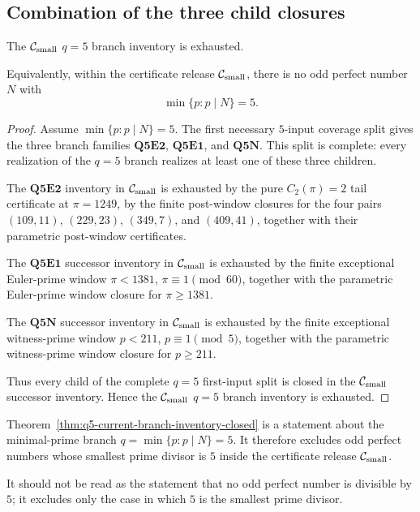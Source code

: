 \subsection{Combination of the three child closures}
\label{subsec:q5-current-branch-inventory-closure}

\begin{theorem}[Closure of the release \texorpdfstring{\(q=5\)}{q=5} branch inventory]
\label{thm:q5-current-branch-inventory-closed}
The \(\mathcal C_{\mathrm{small}}\) \(q=5\) branch inventory is exhausted.

Equivalently, within the certificate release \(\mathcal C_{\mathrm{small}}\), there is no odd
perfect number \(N\) with
\[
  \min\{p:p\mid N\}=5.
\]
\end{theorem}

\begin{proof}
Assume \(\min\{p:p\mid N\}=5\).  The first necessary \(5\)-input coverage split
gives the three branch families \(\mathbf{Q5E2}\), \(\mathbf{Q5E1}\), and
\(\mathbf{Q5N}\).  This split is complete: every realization of the \(q=5\)
branch realizes at least one of these three children.

The \(\mathbf{Q5E2}\) inventory in \(\mathcal C_{\mathrm{small}}\) is exhausted by the pure
\(C_2(\pi)=2\) tail certificate at \(\pi=1249\), by the finite post-window
closures for the four pairs \((109,11)\), \((229,23)\), \((349,7)\), and
\((409,41)\), together with their parametric post-window
certificates.

The \(\mathbf{Q5E1}\) successor inventory in \(\mathcal C_{\mathrm{small}}\) is exhausted by the
finite exceptional Euler-prime window \(\pi<1381\), \(\pi\equiv1\pmod{60}\),
together with the parametric Euler-prime window closure for \(\pi\ge1381\).

The \(\mathbf{Q5N}\) successor inventory in \(\mathcal C_{\mathrm{small}}\) is exhausted by the
finite exceptional witness-prime window \(p<211\), \(p\equiv1\pmod5\), together
with the parametric witness-prime window closure for \(p\ge211\).

Thus every child of the complete \(q=5\) first-input split is closed in the
\(\mathcal C_{\mathrm{small}}\) successor inventory.  Hence the \(\mathcal C_{\mathrm{small}}\) \(q=5\) branch
inventory is exhausted.
\end{proof}

\begin{remark}[Meaning of the \(q=5\) closure]
\label{rem:meaning-of-q5-closure}
Theorem~\ref{thm:q5-current-branch-inventory-closed} is a statement about the
minimal-prime branch \(q=\min\{p:p\mid N\}=5\).  It therefore excludes odd
perfect numbers whose smallest prime divisor is \(5\) inside the certificate
release \(\mathcal C_{\mathrm{small}}\).

It should not be read as the statement that no odd perfect number is divisible
by \(5\); it excludes only the case in which \(5\) is the smallest prime
divisor.
\end{remark}




